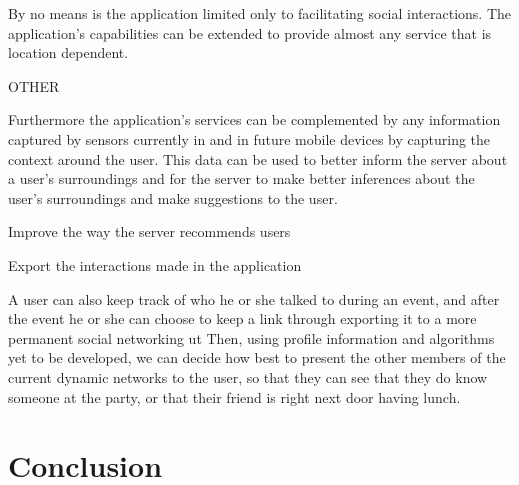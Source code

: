 \documentclass[11pt]{article}
\begin{document}
By no means is the application limited only to facilitating social interactions. The application's capabilities can be extended to provide almost any service that is location dependent. 


OTHER

Furthermore the application's services can be complemented by any information captured by sensors currently in and in future mobile devices by capturing the context around the user. This data can be used to better inform the server about a user's surroundings and for the server to make better inferences about the user's surroundings and make suggestions to the user.


Improve the way the server recommends users


Export the interactions made in the application


A user can also keep track of who he or she talked to during an event, and after the event he or she can choose to keep a link through exporting it to a more permanent social networking ut Then, using profile information and algorithms yet to be developed, we can decide how best to present the other members of the current dynamic networks to the user, so that they can see that they do know someone at the party, or that their friend is right next door having lunch.




 \section{Conclusion}
\end{document}
